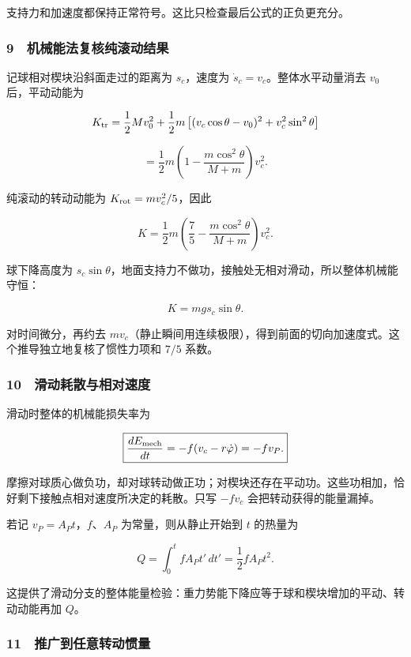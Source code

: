 \documentclass[12pt,a4paper,fontset=fandol]{ctexart}
\begin{document}
支持力和加速度都保持正常符号。这比只检查最后公式的正负更充分。

\subsubsection{9　机械能法复核纯滚动结果}\label{ux673aux68b0ux80fdux6cd5ux590dux6838ux7eafux6edaux52a8ux7ed3ux679c}

记球相对楔块沿斜面走过的距离为 \(s_c\)，速度为
\(\dot s_c=v_c\)。整体水平动量消去 \(v_0\) 后，平动动能为

\[K_{\rm tr}=\frac12Mv_0^2+\frac12m
\left[(v_c\cos\theta-v_0)^2+v_c^2\sin^2\theta\right]\]

\[=\frac12m\left(1-\frac{m\cos^2\theta}{M+m}\right)v_c^2.\]

纯滚动的转动动能为 \(K_{\rm rot}=mv_c^2/5\)，因此

\[K=\frac12m\left(\frac75-\frac{m\cos^2\theta}{M+m}\right)v_c^2.\]

球下降高度为
\(s_c\sin\theta\)，地面支持力不做功，接触处无相对滑动，所以整体机械能守恒：

\[K=mg s_c\sin\theta.\]

对时间微分，再约去
\(mv_c\)（静止瞬间用连续极限），得到前面的切向加速度式。这个推导独立地复核了惯性力项和
\(7/5\) 系数。

\subsubsection{10　滑动耗散与相对速度}\label{ux6ed1ux52a8ux8017ux6563ux4e0eux76f8ux5bf9ux901fux5ea6}

滑动时整体的机械能损失率为

\[\boxed{\frac{dE_{\rm mech}}{dt}=-f(v_c-r\dot\varphi)=-fv_P.}\]

摩擦对球质心做负功，却对球转动做正功；对楔块还存在平动功。这些功相加，恰好剩下接触点相对速度所决定的耗散。只写
\(-fv_c\) 会把转动获得的能量漏掉。

若记 \(v_P=A_Pt\)，\(f\)、\(A_P\) 为常量，则从静止开始到 \(t\) 的热量为

\[Q=\int_0^t fA_Pt'\,dt'=\frac12fA_Pt^2.\]

这提供了滑动分支的整体能量检验：重力势能下降应等于球和楔块增加的平动、转动动能再加
\(Q\)。

\subsubsection{11　推广到任意转动惯量}\label{ux63a8ux5e7fux5230ux4efbux610fux8f6cux52a8ux60efux91cf}
\end{document}
